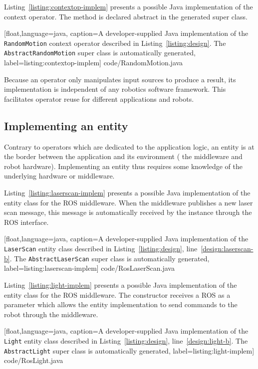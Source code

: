 Listing~\ref{listing:contextop-implem} presents a possible Java
implementation of the  context operator. The
 method is declared abstract in the
 generated super class.

%
[float,language=java,%
caption={A developer-supplied Java implementation of the
  \texttt{Random\-Motion} context operator described in
  Listing~\ref{listing:design}. The \texttt{Abstract\-Random\-Motion}
  super class is automatically generated},%
label={listing:contextop-implem}]%
{code/RandomMotion.java}

Because an operator only manipulates input sources to produce a
result, its implementation is independent of any robotics software
framework. This facilitates operator reuse for different applications
and robots.

\subsection{Implementing an entity}

Contrary to operators which are dedicated to the application logic, an
entity is at the border between the application and its environment
(\eg{} the middleware and robot hardware). Implementing an entity thus
requires some knowledge of the underlying hardware or middleware.

Listing~\ref{listing:laserscan-implem} presents a possible Java
implementation of the  entity class for the ROS
middleware. When the middleware publishes a new laser scan message,
this message is automatically received by the 
instance through the ROS  interface.

%
[float,language=java,%
caption={A developer-supplied Java implementation of the
  \texttt{LaserScan} entity class described in
  Listing~\ref{listing:design}, line~\ref{design:laserscan-b}. The
  \texttt{Abstract\-Laser\-Scan} super class is automatically
  generated},%
label={listing:laserscan-implem}]%
{code/RosLaserScan.java}

Listing~\ref{listing:light-implem} presents a possible Java
implementation of the  entity class for the ROS middleware.
The constructor receives a ROS  as a parameter which
allows the entity implementation to send commands to the robot through
the middleware.

%
[float,language=java,%
caption={A developer-supplied Java implementation of the
  \texttt{Light} entity class described in
  Listing~\ref{listing:design}, line~\ref{design:light-b}. The
  \texttt{Abstract\-Light} super class is automatically generated},%
label={listing:light-implem}]%
{code/RosLight.java}

